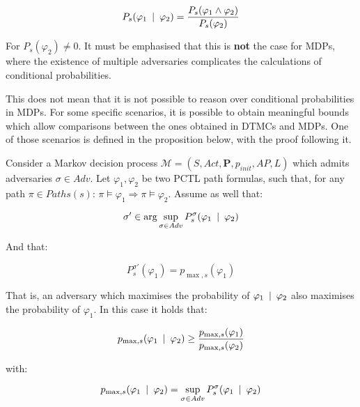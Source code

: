 \begin{equation}
	P_s (\varphi_1 \:\mid\: \varphi_2) = \frac{P_s (\varphi_1 \wedge \varphi_2)}{P_s (\varphi_2)}
\end{equation}

For $P_s (\varphi_2) \neq 0$. It must be emphasised that this is \textbf{not} the case for MDPs, where the existence of multiple adversaries complicates the calculations of conditional probabilities.

This does not mean that it is not possible to reason over conditional probabilities in MDPs. For some specific scenarios, it is possible to obtain meaningful bounds which allow comparisons between the ones obtained in DTMCs and MDPs. One of those scenarios is defined in the proposition below, with the proof following it.

\begin{proposition}
Consider a Markov decision process $\mathcal{M} = (S, Act, \mathbf{P}, p_{init}, AP, L)$ which admits adversaries $\sigma \in Adv$. Let $\varphi_1, \varphi_2$ be two PCTL path formulas, such that, for any path $\pi \in Paths(s)$: $\pi \models \varphi_1 \Rightarrow \pi \models \varphi_2$. Assume as well that:

\begin{equation}
	\sigma' \in \arg\sup_{\sigma \in Adv} P^{\sigma}_s (\varphi_1 \:\mid\: \varphi_2)
\end{equation}

And that:

\begin{equation}
	P^{\sigma'}_s (\varphi_1) = p_{\max, s} (\varphi_1)
\end{equation}

That is, an adversary which maximises the probability of $\varphi_1 \:\mid\: \varphi_2$ also maximises the probability of $\varphi_1$. In this case it holds that:

\begin{equation}
	p_{\max, s} (\varphi_1 \:\mid\: \varphi_2) \geq \frac{p_{\max, s} (\varphi_1)}{p_{\max, s} (\varphi_2)}
\end{equation}

with:

\begin{equation}
	p_{\max, s} (\varphi_1 \:\mid\: \varphi_2) = \sup_{\sigma \in Adv} P^{\sigma}_s (\varphi_1 \:\mid\: \varphi_2)
\end{equation}

\end{proposition}
 

